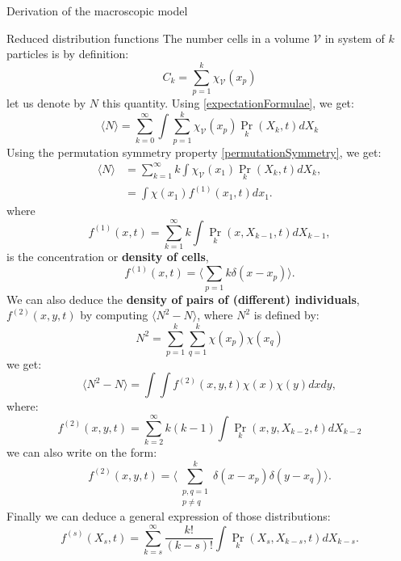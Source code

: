 \begin{paragraph}{Derivation of the macroscopic model}
\begin{paragraph}{Reduced distribution functions}
The number cells in a volume $\mathcal{V}$ in system of $k$ particles is by definition: 
$$ C_k = \sum_{p=1}^{k} \chi_{\mathcal{V}}(x_p)$$
let us denote by $N$ this quantity. Using \eqref{expectationFormulae}, we get: 
\begin{equation}
\langle N \rangle =  \sum_{k=0}^{\infty} \int \sum_{p=1}^{k} \chi_{\mathcal{V}}(x_p) \Pr_k(X_k, t) dX_k
\end{equation}
 Using the permutation symmetry property \eqref{permutationSymmetry}, we get: 
 \begin{align}
	 \langle N \rangle & = \sum_{k=1}^{\infty} k \int  \chi_{\mathcal{V}}(x_1) \Pr_k(X_k, t) dX_k, \\[5pt]
	 & =  \int \chi(x_1) f^{(1)}(x_1, t)dx_1 .
	\end{align}
where 
\begin{equation}
\label{firstReducedFunction}
f^{(1)}(x,t) =  \sum_{k=1}^{\infty} k \int \Pr_k(x, X_{k-1}, t)dX_{k-1},
\end{equation}
is the concentration or \textbf{density of cells}, 
\begin{equation}
f^{(1)}(x,t) = \langle \sum_{p=1}{k} \delta(x-x_p)\rangle .
\end{equation}
We can also deduce the \textbf{density of pairs of (different) individuals}, $f^{(2)}(x,y,t)$ by computing $\langle N^2 - N \rangle$, where $N^2$ is defined by: 
$$ N^2 =  \sum_{p=1}^{k} \sum_{q=1}^{k} \chi(x_p) \chi(x_q) $$
we get: 
\begin{equation}
	\langle N^2 - N \rangle = \int \int f^{(2)}(x, y, t) \chi(x)\chi(y) dxdy,
\end{equation}
where: 
\begin{equation}
f^{(2)}(x,y,t) = \sum_{k=2}^{\infty} k(k-1) \int \Pr_k(x, y, X_{k-2}, t)dX_{k-2}
\end{equation} 
we can also write on the form: 
\begin{equation}
f^{(2)}(x,y,t) = \langle \sum_{\substack{p, q=1 \\ p \neq q}}^{k} \delta(x - x_p) \delta(y - x_q) \rangle.
\end{equation} 
Finally we can deduce a general expression of those distributions:
\begin{equation}
f^{(s)}(X_s,t) = \sum_{k=s}^{\infty} \dfrac{k!}{(k-s)!} \int \Pr_k(X_s, X_{k-s},t)dX_{k-s}.
\end{equation}
\end{paragraph}


\end{paragraph}
